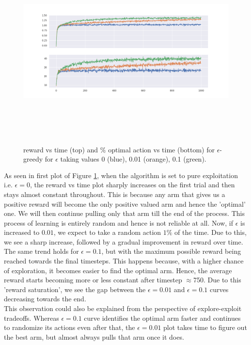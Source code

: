 \documentclass[12pt]{extarticle}
\begin{document}
\begin{figure}[H]
	\includegraphics[width=\textwidth, height=10cm]{epsilon-greedy.png}
	\caption{reward vs time (top) and $\%$ optimal action vs time (bottom) for $\epsilon$-greedy for $\epsilon$ taking values 0 (blue), 0.01 (orange), 0.1 (green).}
	\label{fig:epsilon-greedy}
\end{figure}

As seen in first plot of Figure \ref{fig:epsilon-greedy}, when the algorithm is set to pure exploitation i.e. $\epsilon = 0$, the reward vs time plot sharply increases on the first trial and then stays almost constant throughout. This is because any arm that gives us a positive reward will become the only positive valued arm and hence the 'optimal' one. We will then continue pulling only that arm till the end of the process. This process of learning is entirely random and hence is not reliable at all. Now, if $\epsilon$ is increased to $0.01$, we expect to take a random action $1\%$ of the time. Due to this, we see a sharp increase, followed by a gradual improvement in reward over time. The same trend holds for $\epsilon = 0.1$, but with the maximum possible reward being reached towards the final timesteps. This happens because, with a higher chance of exploration, it becomes easier to find the optimal arm. Hence, the average reward starts becoming more or less constant after timestep $\approx$750. Due to this 'reward saturation', we see the gap between the $\epsilon=0.01$ and $\epsilon=0.1$ curves decreasing towards the end.\\

This observation could also be explained from the perspective of explore-exploit tradeoffs. Whereas $\epsilon=0.1$ curve identifies the optimal arm faster and continues to randomize its actions even after that, the $\epsilon=0.01$ plot takes time to figure out the best arm, but almost always pulls that arm once it does.\\
\end{document}
